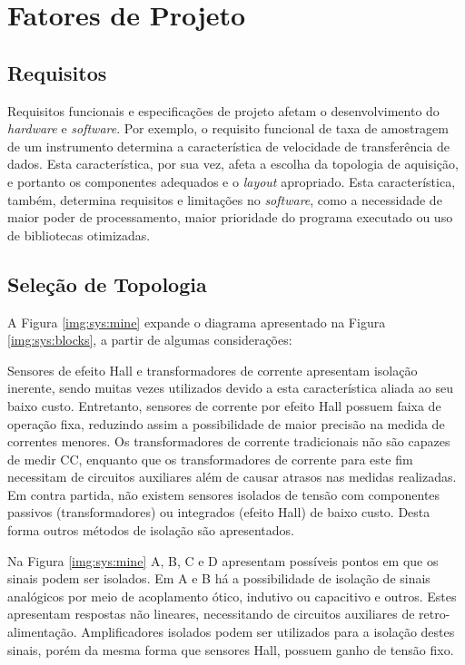 \chapter{Fatores de Projeto}\label{cap:req}

	\section{Requisitos}\label{sec:req:intro}

		Requisitos funcionais e especificações de projeto afetam o desenvolvimento do \textit{hardware} e \textit{software}. Por exemplo, o requisito funcional de taxa de amostragem de um instrumento determina a característica de velocidade de transferência de dados. Esta característica, por sua vez, afeta a escolha da topologia de aquisição, e portanto os componentes adequados e o \textit{layout} apropriado. Esta característica, também, determina requisitos e limitações no \textit{software}, como a necessidade de maior poder de processamento, maior prioridade do programa executado ou uso de bibliotecas otimizadas.


		\section{Seleção de Topologia}\label{sec:req:hw:topologia}

			A Figura \ref{img:sys:mine} expande o diagrama apresentado na Figura \ref{img:sys:blocks}, a partir de algumas considerações:

			Sensores de efeito Hall e transformadores de corrente apresentam isolação inerente, sendo muitas vezes utilizados devido a esta característica aliada ao seu baixo custo. Entretanto, sensores de corrente por efeito Hall possuem faixa de operação fixa, reduzindo assim a possibilidade de maior precisão na medida de correntes menores. Os transformadores de corrente tradicionais não são capazes de medir CC, enquanto que os transformadores de corrente para este fim necessitam de circuitos auxiliares além de causar atrasos nas medidas realizadas. Em contra partida, não existem sensores isolados de tensão com componentes passivos (transformadores) ou integrados (efeito Hall) de baixo custo. Desta forma outros métodos de isolação são apresentados.

			Na Figura \ref{img:sys:mine} A, B, C e D apresentam possíveis pontos em que os sinais podem ser isolados. Em A e B há a possibilidade de isolação de sinais analógicos por meio de acoplamento ótico, indutivo ou capacitivo e outros. Estes apresentam respostas não lineares, necessitando de circuitos auxiliares de retro-alimentação. Amplificadores isolados podem ser utilizados para a isolação destes sinais, porém da mesma forma que sensores Hall, possuem ganho de tensão fixo.

